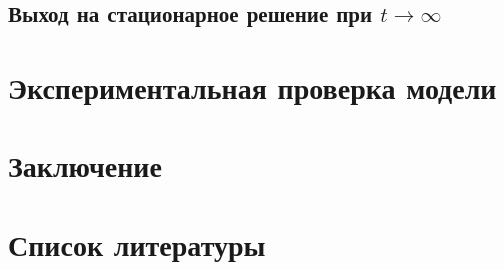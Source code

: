\documentclass[a4paper, 14pt, russian]{article}
\begin{document}
\subsection{Выход на стационарное решение при $t \rightarrow \infty$}

\section{Экспериментальная проверка модели}

\section{Заключение}

\section{Список литературы}
\end{document}
